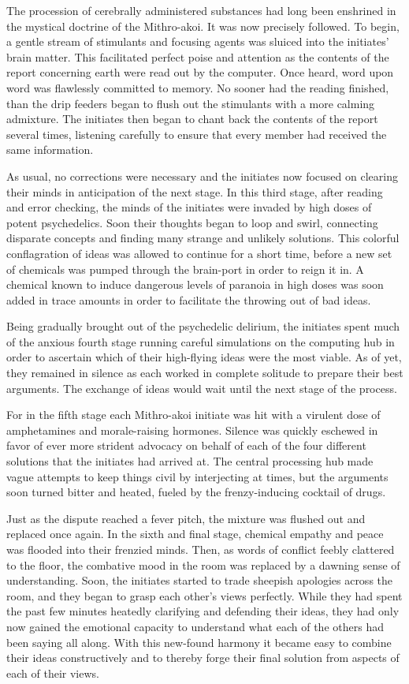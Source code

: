 \documentclass[12pt]{article}
\begin{document}
The procession of cerebrally administered substances had long been enshrined in the mystical doctrine of the Mithro-akoi.
It was now precisely followed.
To begin, a gentle stream of stimulants and focusing agents was sluiced into the initiates' brain matter.
This facilitated perfect poise and attention as the contents of the report concerning earth were read out by the computer.
Once heard, word upon word was flawlessly committed to memory.
No sooner had the reading finished,
than the drip feeders began to flush out the stimulants with a more calming admixture.
The initiates then began to chant back the contents of the report several times, listening carefully to ensure that every member had received the same information.

As usual, no corrections were necessary and the initiates now focused on clearing their minds in anticipation of the next stage.
In this third stage, after reading and error checking, 
the minds of the initiates were invaded by high doses of potent psychedelics.
Soon their thoughts began to loop and swirl, connecting disparate concepts and finding many strange and unlikely solutions.
This colorful conflagration of ideas was allowed to continue for a short time,
before a new set of chemicals was pumped through the brain-port in order to reign it in.
A chemical known to induce dangerous levels of paranoia in high doses was soon added in trace amounts in order to facilitate the throwing out of bad ideas.

Being gradually brought out of the psychedelic delirium,
the initiates spent much of the anxious fourth stage running careful simulations on the computing hub in order to ascertain which of their high-flying ideas were the most viable.
As of yet, they remained in silence as each worked in complete solitude to prepare their best arguments.
The exchange of ideas would wait until the next stage of the process.

For in the fifth stage each Mithro-akoi initiate was hit with a virulent dose of amphetamines and morale-raising hormones.
Silence was quickly eschewed in favor of ever more strident advocacy on behalf of each of the four different solutions that the initiates had arrived at.
The central processing hub made vague attempts to keep things civil by interjecting at times,
but the arguments soon turned bitter and heated,
fueled by the frenzy-inducing cocktail of drugs.

Just as the dispute reached a fever pitch,
the mixture was flushed out and replaced once again.
In the sixth and final stage, 
chemical empathy and peace was flooded into their frenzied minds.
Then, as words of conflict feebly clattered to the floor, the combative mood in the room was replaced by a dawning sense of understanding.
Soon, the initiates started to trade sheepish apologies across the room, 
and they began to grasp each other's views perfectly.
While they had spent the past few minutes heatedly clarifying and defending their ideas, they had only now gained the emotional capacity to understand what each of the others had been saying all along. 
With this new-found harmony it became easy to combine their ideas constructively and to thereby forge their final solution from aspects of each of their views.
\end{document}
